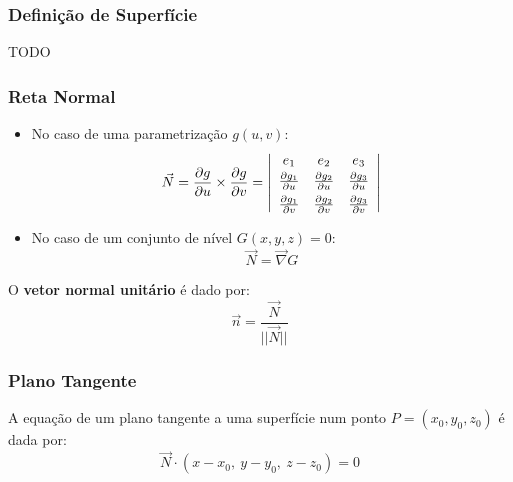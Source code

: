 \documentclass[11pt, a4paper]{article}
\begin{document}
\subsubsection{Definição de Superfície}

TODO

\subsubsection{Reta Normal}

\begin{itemize}
    \item No caso de uma parametrização $g(u,v)$:
          \begin{equation*}
              \vec{N} = \frac{\partial g}{\partial u} \times \frac{\partial g}{\partial v}
              = \left\vert
              \begin{array}{c c c}
                  e_1                             & e_2 & e_3 \\[2pt]
                  \frac{\partial g_1}{\partial u} &
                  \frac{\partial g_2}{\partial u} &
                  \frac{\partial g_3}{\partial u}             \\[4pt]
                  \frac{\partial g_1}{\partial v} &
                  \frac{\partial g_2}{\partial v} &
                  \frac{\partial g_3}{\partial v}
              \end{array}
              \right\vert
          \end{equation*}
    \item No caso de um conjunto de nível $G(x, y, z) = 0$:
          \begin{equation*}
              \vec{N} = \vec{\nabla} G
          \end{equation*}
\end{itemize}

O \textbf{vetor normal unitário} é dado por:
\begin{equation*}
    \vec{n} = \frac{\vec{N}}{||\vec{N}||}
\end{equation*}

\subsubsection{Plano Tangente}

A equação de um plano tangente a uma superfície num ponto $P = (x_0, y_0, z_0)$ é dada por:
\begin{equation*}
    \vec{N} \cdot \left(x - x_0,\ y - y_0,\ z - z_0\right) = 0
\end{equation*}
\end{document}
